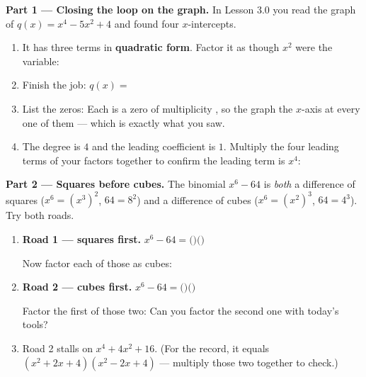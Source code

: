\documentclass[10pt]{article}
\begin{document}
\begin{tcolorbox}[colback=white, colframe=black!40, title=\textbf{Tier E --- Extension},
    fonttitle=\bfseries, arc=1.5mm, left=3mm, right=3mm, top=2mm, bottom=2mm, breakable]
\textbf{Part 1 --- Closing the loop on the graph.} In Lesson 3.0 you read the graph of
$q(x) = x^4 - 5x^2 + 4$ and found four $x$-intercepts.
\begin{enumerate}[label=(\alph*), leftmargin=1.8em, itemsep=6pt]
  \item It has three terms in \textbf{quadratic form}. Factor it as though $x^2$ were the variable:
        \blank{5.0cm}
  \item Finish the job: \; $q(x) = $ \blank{6.0cm}
  \item List the zeros: \blank{4.0cm} \; Each is a zero of multiplicity \blank{1.0cm}, so the graph
        \blank{2.6cm} the $x$-axis at every one of them --- which is exactly what you saw.
  \item The degree is $4$ and the leading coefficient is $1$. Multiply the four leading terms of your
        factors together to confirm the leading term is $x^4$: \blank{3.4cm}
\end{enumerate}

\vspace{5pt}
\textbf{Part 2 --- Squares before cubes.} The binomial $x^6 - 64$ is \emph{both} a difference of
squares ($x^6 = (x^3)^2$, $64 = 8^2$) and a difference of cubes ($x^6 = (x^2)^3$, $64 = 4^3$). Try
both roads.
\begin{enumerate}[label=(\alph*), leftmargin=1.8em, itemsep=6pt]
  \item \textbf{Road 1 --- squares first.} \; $x^6 - 64 = ($\blank{1.6cm}$)($\blank{1.6cm}$)$

        \vspace{2pt}
        Now factor each of those as cubes: \blank{6.5cm}

  \item \textbf{Road 2 --- cubes first.} \; $x^6 - 64 = ($\blank{1.6cm}$)($\blank{2.6cm}$)$

        \vspace{2pt}
        Factor the first of those two: \blank{3.6cm} \; Can you factor the second one with today's
        tools? \blank{1.4cm}

  \item Road 2 stalls on $x^4 + 4x^2 + 16$. (For the record, it equals $(x^2+2x+4)(x^2-2x+4)$ ---
        multiply those two together to check.) \blank{5.0cm}


\end{enumerate}
\end{tcolorbox}
\end{document}
